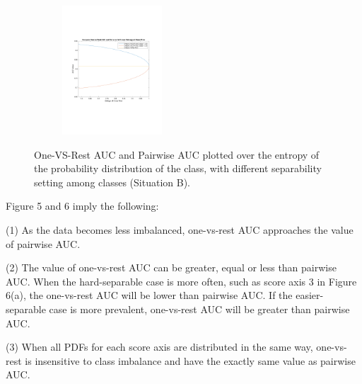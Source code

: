 \documentclass[twoside,11pt]{article}
\renewcommand{\>}{{\rightarrow}}
\newcommand{\1}{{\mathbf 1}}
\newcommand{\0}{{\mathbf 0}}
\begin{document}
\begin{figure}[t!]
\begin{subfigure}[b]{0.5\textwidth}
        \caption{}
    \end{subfigure}%
    ~ 
    \begin{subfigure}[b]{0.5\textwidth}
        \centering
        \includegraphics[height=1.9in]{pic/vis_ent_auc_A.pdf}
        \caption{}
    \end{subfigure}
    \caption{One-VS-Rest AUC and Pairwise AUC plotted over the entropy of the probability distribution of the class, with different separability setting among classes (Situation B). }
\end{figure}

Figure 5 and 6 imply the following:

(1) As the data becomes less imbalanced, one-vs-rest AUC approaches the value of pairwise AUC. 

(2) The value of one-vs-rest AUC can be greater, equal or less than pairwise AUC. When the hard-separable case is more often, such as score axis 3 in Figure 6(a), the one-vs-rest AUC will be lower than pairwise AUC. If the easier-separable case is more prevalent, one-vs-rest AUC will be greater than pairwise AUC.

(3) When all PDFs for each score axis are distributed in the same way, one-vs-rest is insensitive to class imbalance and have the exactly same value as pairwise AUC.



\end{document}
